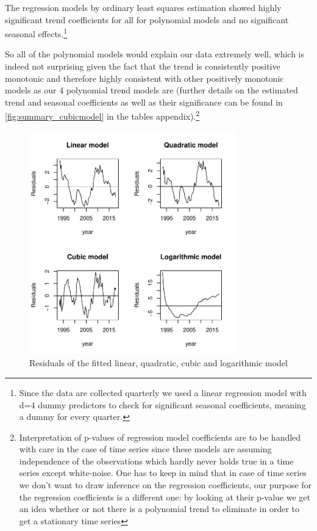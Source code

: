 \documentclass[11pt,a4paper]{article}
\begin{document}
The regression models by ordinary least squares estimation \cite[p.~11]{htf09} showed highly significant trend coefficients for all for polynomial models and no significant seasonal effects.\footnote{
    Since the data are collected quarterly we used a linear regression model with d=4 dummy predictors to check for significant seasonal coefficients, meaning a dummy for every quarter.
}

So all of the polynomial models would explain our data extremely well, which is indeed not surprising given the fact that the trend is consistently positive monotonic and therefore highly consistent with other positively monotonic models as our 4 polynomial trend models are (further details on the estimated trend and seasonal coefficients as well as their significance can be found in \cref{fig:summary_cubicmodel} in the tables appendix).\footnote{
    Interpretation of p-values of regression model coefficients are to be handled with care in the case of time series since these models are assuming independence of the observations which hardly never holds true in a time series except white-noise.
    One has to keep in mind that in case of time series we don't want to draw inference on the regression coefficients, our purpose for the regression coefficients is a different one: by looking at their p-value we get an idea whether or not there is a polynomial trend to eliminate in order to get a stationary time series
}

\begin{figure}
    \centering
    \includegraphics[width=0.8\textwidth]{resid_polynomials}
    \caption{Residuals of the fitted linear, quadratic, cubic and logarithmic model}
    \label{fig:resid_polynomials}
\end{figure}
\end{document}
